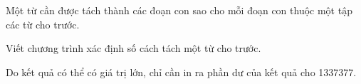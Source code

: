 Một từ cần được tách thành các đoạn con sao cho mỗi đoạn con thuộc một tập các từ cho trước.  

   Viết chương trình xác định số cách tách một từ cho trước.  

   Do kết quả có thể có giá trị lớn, chỉ cần in ra phần dư của kết quả cho 1337377.  

\